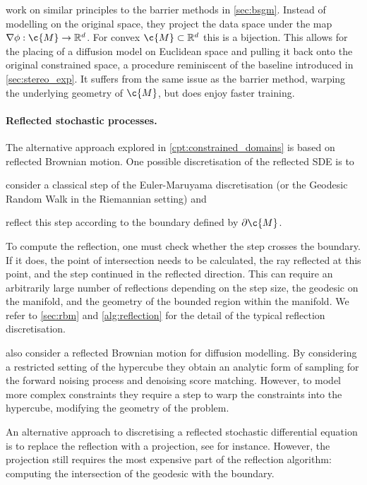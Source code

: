  \cite{tae2023mirror,liu2024mirror} work on similar principles to the barrier methods in \cref{sec:bsgm}.
Instead of modelling on the original space, they project the data space under the map \(\nabla \phi: \c{M} \to \R^d\).
For convex \(\c{M}\subset \R^d\) this is a bijection.
This allows for the placing of a diffusion model on Euclidean space and pulling it back onto the original constrained space, a procedure reminiscent of the baseline introduced in \cref{sec:stereo_exp}.
It suffers from the same issue as the barrier method, warping the underlying geometry of \(\c{M}\), but does enjoy faster training.

\paragraph{Reflected stochastic processes.}
The alternative approach explored in \cref{cpt:constrained_domains} is based on reflected Brownian motion.
One possible discretisation of the reflected SDE is to \begin{enumerate*}[label=(\roman*)] \item consider a classical step of the Euler-Maruyama discretisation (or the Geodesic Random Walk in the Riemannian setting) and \item reflect this step according to the boundary defined by \(\partial \c{M}\).
\end{enumerate*}
To compute the reflection, one must check whether the step crosses the boundary.
If it does, the point of intersection needs to be calculated, the ray reflected at this point, and the step continued in the reflected direction.
This can require an arbitrarily large number of reflections depending on the step size, the geodesic on the manifold, and the geometry of the bounded region within the manifold.
We refer to \cref{sec:rbm} and \cref{alg:reflection} for the detail of the typical reflection discretisation.

\textcite{lou2023reflected} also consider a reflected Brownian motion for diffusion modelling.
By considering a restricted setting of the hypercube they obtain an analytic form of sampling for the forward noising process and denoising score matching.
However, to model more complex constraints they require a step to warp the constraints into the hypercube, modifying the geometry of the problem.

An alternative approach to discretising a reflected stochastic differential equation is to replace the reflection with a projection, see \cite{slominski1994approximation} for instance.
However, the projection still requires the most expensive part of the reflection algorithm: computing the intersection of the geodesic with the boundary.

